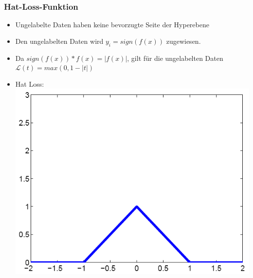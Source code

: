 \documentclass{beamer}
\begin{document}
\begin{frame}
\frametitle{Hat-Loss-Funktion}
    \begin{itemize}
        \item Ungelabelte Daten haben keine bevorzugte Seite der Hyperebene
        \item Den ungelabelten Daten wird $y_i = sign(f(x))$ zugewiesen. 
        \item Da $sign(f(x))*f(x) = |f(x)|$, gilt f\"ur die ungelabelten Daten $\mathcal{L}(t) = max(0, 1-|t|)$
        \item Hat Loss: \includegraphics[scale=0.2]{img/hat_loss_function.png}
    \end{itemize}
\end{frame}
\end{document}
